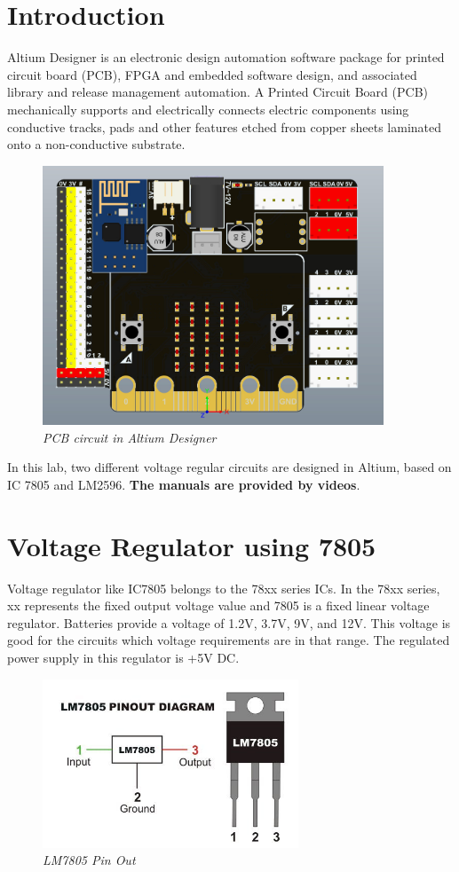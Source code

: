 \section{Introduction}
Altium Designer is an electronic design
automation software package for printed circuit board (PCB), FPGA and embedded software design, and associated library and release management automation. A Printed Circuit Board (PCB) mechanically supports and electrically connects electric components using conductive tracks, pads and other features etched from copper sheets laminated onto a non-conductive substrate.

\begin{figure}[!htp]
    \centering
    \includegraphics[width=4in]{source/picture/bai_4/bbc_altium.jpg}
    \caption{\textit{PCB circuit in Altium Designer}}
    \label{bai4_pic}
\end{figure}


In this lab, two different voltage regular circuits are designed in Altium, based on IC 7805 and LM2596. \textbf{The manuals are provided by videos}.

\section{Voltage Regulator using 7805}
Voltage regulator like IC7805 belongs to the 78xx series ICs. In the 78xx series, xx represents the fixed output voltage value and 7805 is a fixed linear voltage regulator. Batteries provide a voltage of 1.2V, 3.7V, 9V, and 12V. This voltage is good for the circuits which voltage requirements are in that range. The regulated power supply in this regulator is +5V DC. \\

\begin{figure}[!htp]
    \centering
    \includegraphics[width=3in]{source/picture/bai_4/LM7805_PinOut.jpg}
    \caption{\textit{LM7805 Pin Out}}
    \label{bai4_pic1}
\end{figure}

